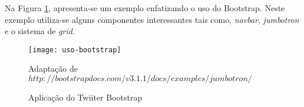 Na Figura \ref{uso-bootstrap}, apresenta-se um exemplo enfatizando o uso do Bootstrap. Neste exemplo utiliza-se alguns componentes interessantes tais como, \textit{navbar}, \textit{jumbotron} e o sistema de \textit{grid}.

\graphicspath{{figuras/}}
\begin{figure}[H]
\centering
\texttt{[image: uso-bootstrap]}
\caption{Aplicação do Twiiter Bootstrap}{Adaptação de $http://bootstrapdocs.com/v3.1.1/docs/examples/jumbotron/$}
\label{uso-bootstrap}
\end{figure}
  












